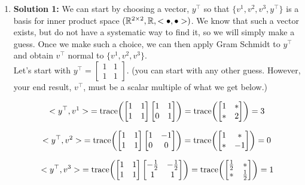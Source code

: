 \documentclass[letterpaper]{article}
\begin{document}
\begin{enumerate}
\item \textbf{Solution 1:} We can start by choosing a vector, $y^\top$ so that $\{v^1, v^2, v^3, y^\top\}$ is a basis for inner product space $(\mathbb R^{2 \times 2}, \mathbb R, <\bullet, \bullet>)$. We know that such a vector exists, but do not have a systematic way to find it, so we will simply make a guess. Once we make such a choice, we can then apply Gram Schmidt to $y^\top$ and obtain $v^\top$ normal to $\{v^1, v^2, v^3\}$.\\

Let's start with $y^\top = \begin{bmatrix}1 & 1 \\1 & 1 \end{bmatrix}$. (you can start with any other guess. However, your end result, $v^\top$, must be a scalar multiple of what we get below.)

$${<y^\top, v^1>} = \mathrm{trace}{\left(\begin{bmatrix}1 & 1 \\ 1 & 1 \end{bmatrix} \begin{bmatrix}1 & 1 \\ 0 & 1 \end{bmatrix}\right)} = \mathrm{trace}{\left(\begin{bmatrix}1 & * \\ * & 2 \end{bmatrix}\right)}= 3$$

$${<y^\top, v^2>} = \mathrm{trace}{\left(\begin{bmatrix}1 & 1 \\ 1 & 1 \end{bmatrix} \begin{bmatrix}1 & -1 \\ 0 & 0 \end{bmatrix}\right)} = \mathrm{trace}{\left(\begin{bmatrix}1 & * \\ * & -1 \end{bmatrix}\right)}= 0$$

$${<y^\top, v^3>} = \mathrm{trace}{\left(\begin{bmatrix}1 & 1 \\ 1 & 1 \end{bmatrix} \begin{bmatrix}-\frac{1}{2} & -\frac{1}{2} \\ 1  & 1 \end{bmatrix}\right)} = \mathrm{trace}{\left(\begin{bmatrix}\frac{1}{2} & * \\ * & \frac{1}{2} \end{bmatrix}\right)}= 1$$


\end{enumerate}
\end{document}
